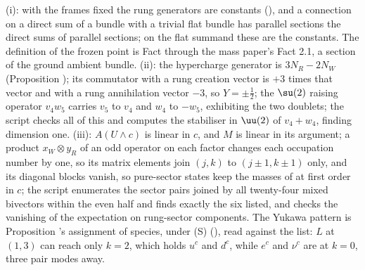 (i): with the frames fixed the rung generators are constants (), and a connection on a direct sum of a bundle with a trivial flat bundle has parallel sections the direct sums of parallel sections; on the flat summand these are the constants. The definition of the frozen point is Fact  through the mass paper's Fact 2.1, a section of the ground ambient bundle. (ii): the hypercharge generator is $3N_{R} - 2N_{W}$ (Proposition ); its commutator with a rung creation vector is $+3$ times that vector and with a rung annihilation vector $-3$, so $Y = \pm\tfrac12$; the $\su(2)$ raising operator $v_{4}w_{5}$ carries $v_{5}$ to $v_{4}$ and $w_{4}$ to $-w_{5}$, exhibiting the two doublets; the script checks all of this and computes the stabiliser in $\uu(2)$ of $v_{4} + w_{4}$, finding dimension one. (iii): $A(U \wedge c)$ is linear in $c$, and $M$ is linear in its argument; a product $x_{W} \otimes y_{R}$ of an odd operator on each factor changes each occupation number by one, so its matrix elements join $(j,k)$ to $(j \pm 1, k \pm 1)$ only, and its diagonal blocks vanish, so pure-sector states keep the masses of  at first order in $c$; the script enumerates the sector pairs joined by all twenty-four mixed bivectors within the even half and finds exactly the six listed, and checks the vanishing of the expectation on rung-sector components. The Yukawa pattern is Proposition 's assignment of species, under (S) (), read against the list: $L$ at $(1,3)$ can reach only $k = 2$, which holds $u^{c}$ and $d^{c}$, while $e^{c}$ and $\nu^{c}$ are at $k = 0$, three pair modes away.
